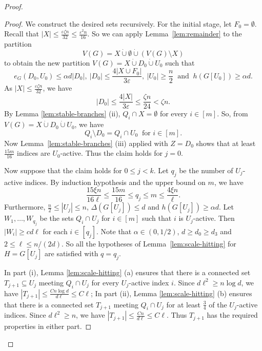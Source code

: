 \documentclass[11pt,a4paper]{article}
\theoremstyle{definition}
\theoremstyle{remark}
\newcommand{\eps}{\varepsilon}
\begin{document}
\begin{proof}
\begin{proof}
We construct the desired sets recursively.
For the initial stage, let $F_0=\emptyset$. Recall that
$|X|\le\frac{\eps\zeta n}{32}\le\frac{\eps^2n}{16}$.
So we can apply 
Lemma~\ref{lem:remainder} to the partition
\[
 V(G)=X\mathbin{\dot\cup}\emptyset
       \mathbin{\dot\cup}(V(G)\setminus X)
\]
to obtain the new partition $V(G)=X\mathbin{\dot\cup}D_0
       \mathbin{\dot\cup}U_0$ such that
\[
 e_G(D_0,U_0)\le\alpha d|D_0|,
 \ 
 |D_0|\le\frac{4|X\cup F_0|}{3\eps}, \ 
 |U_0|\ge\frac{n}{2} \ 
 \text{ and } \
 h(G[U_0])\ge\alpha d.
\]
As $|X|\le\frac{\eps\zeta n}{32}$, we have
\[
 |D_0|\le\frac{4|X|}{3\eps}
 \le\frac{\zeta n}{24}<\zeta n.
\]
By Lemma \ref{lem:stable-branches} (ii), $Q_i\cap X=\emptyset$ for every $i\in[m]$. So, from $V(G)=X\mathbin{\dot\cup}D_0
       \mathbin{\dot\cup}U_0$, we have
\[
 Q_i\setminus D_0=Q_i\cap U_0
\ \text{ for }i\in[m].
\]
Now Lemma~\ref{lem:stable-branches} (iii) applied
with $Z=D_0$  shows that at least $\frac{15m}{16}$ indices are
$U_0$-active. Thus the claim holds for $j=0$.


Now suppose that the claim holds  for $0\le j<k$. Let $q_j$ be the number of $U_j$-active indices. By induction hypothesis and the upper bound on $m$, we have
\[
 \frac{15\xi n}{16\ell}
 \le\frac{15m}{16}
 \le q_j\le m\le\frac{4\xi n}{\ell}.
\]
Furthermore, $\frac{n}{2}\le |U_j|\le n$, $\Delta(G[U_j])\le d$ and
$h(G[U_j])\ge\alpha d$. Let $W_1,\ldots,W_{q_j}$ be the sets $Q_i\cap U_j$
for $i\in[m]$ such that $i$ is $U_j$-active. Then $|W_i|\ge cd\ell$ for each $i\in [q_j]$. 
Note that $\alpha\in(0,1/2)$, $d\ge d_0\ge d_3$ and $2\le\ell\le n/(2d)$. 
So all the hypotheses of Lemma~\ref{lem:scale-hitting} for
$H=G[U_j]$ are satisfied with $q=q_j$.





In part (i), Lemma \ref{lem:scale-hitting} (a) ensures that there is a connected set $T_{j+1}\subseteq U_j$ meeting $Q_i\cap U_j$ for every $U_j$-active index $i$. Since $d\ell^2\ge n\log d$, we have 
$|T_{j+1}|\le \frac {Cn\log d}{d\ell}\le C\ell$; 
In part (ii), Lemma \ref{lem:scale-hitting} (b) ensures that there is a connected set $T_{j+1}$ meeting $Q_i\cap U_j$ for at least $\frac{3}{4}$ of the
$U_j$-active indices. Since $d\ell^2\ge n$, we have 
$|T_{j+1}|\le\frac{Cn}{d\ell}\le C\ell$.
Thus $T_{j+1}$ has the required properties in either part.



\end{proof}
\end{proof}
\end{document}
